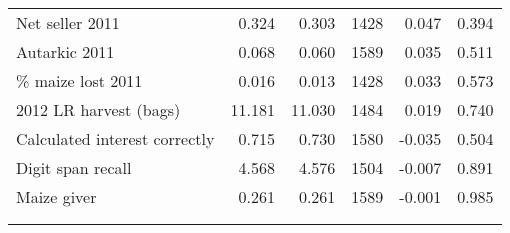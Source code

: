 \begin{tabular}{lrrrrr}
Net seller 2011 & 0.324 & 0.303 & 1428 & 0.047 & 0.394 \\
Autarkic 2011 & 0.068 & 0.060 & 1589 & 0.035 & 0.511 \\
\% maize lost 2011 & 0.016 & 0.013 & 1428 & 0.033 & 0.573 \\
2012 LR harvest (bags) & 11.181 & 11.030 & 1484 & 0.019 & 0.740 \\
Calculated interest correctly & 0.715 & 0.730 & 1580 & -0.035 & 0.504 \\
Digit span recall & 4.568 & 4.576 & 1504 & -0.007 & 0.891 \\
Maize giver & 0.261 & 0.261 & 1589 & -0.001 & 0.985 \\
\\[-1.8ex]\hline 
 \hline \\[-1.8ex]
\end{tabular}